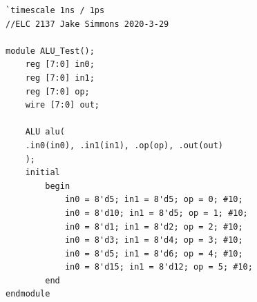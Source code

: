 \documentclass[11pt]{article}
\begin{document}
\begin{lstlisting}[style=Verilog,
caption=ALU Test Bench Code,
label=code:ex 
]
`timescale 1ns / 1ps
//ELC 2137 Jake Simmons 2020-3-29

module ALU_Test();
	reg [7:0] in0;
	reg [7:0] in1;
	reg [7:0] op;
	wire [7:0] out;

	ALU alu(
	.in0(in0), .in1(in1), .op(op), .out(out)
	);
	initial 
		begin
			in0 = 8'd5; in1 = 8'd5; op = 0; #10;
			in0 = 8'd10; in1 = 8'd5; op = 1; #10;
			in0 = 8'd1; in1 = 8'd2; op = 2; #10;
			in0 = 8'd3; in1 = 8'd4; op = 3; #10;
			in0 = 8'd5; in1 = 8'd6; op = 4; #10;
			in0 = 8'd15; in1 = 8'd12; op = 5; #10;
		end
endmodule
\end{lstlisting}
\end{document}
